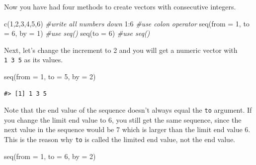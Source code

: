 \documentclass[
]{book}
\newenvironment{Shaded}{\begin{snugshade}}{\end{snugshade}}
\newcommand{\AttributeTok}[1]{\textcolor[rgb]{0.77,0.63,0.00}{#1}}
\newcommand{\CommentTok}[1]{\textcolor[rgb]{0.56,0.35,0.01}{\textit{#1}}}
\newcommand{\DecValTok}[1]{\textcolor[rgb]{0.00,0.00,0.81}{#1}}
\newcommand{\FunctionTok}[1]{\textcolor[rgb]{0.00,0.00,0.00}{#1}}
\newcommand{\NormalTok}[1]{#1}
\newcommand{\SpecialCharTok}[1]{\textcolor[rgb]{0.00,0.00,0.00}{#1}}
\newenvironment{infobox}[1]
  {
  \begin{itemize}
  \renewcommand{\labelitemi}{
    \raisebox{-.7\height}[0pt][0pt]{
      {\setkeys{Gin}{width=3em,keepaspectratio}
        \texttt{[image: pics/\#1]}}
    }
  }
  \setlength{\fboxsep}{1em}
  \begin{blackbox}
  \item
  }
  {
  \end{blackbox}
  \end{itemize}
  }
\newenvironment{blackbox}{
  \definecolor{shadecolor}{rgb}{0, 0, 0}  %
  \color{white}
  \begin{shaded}}
 {\end{shaded}}
\begin{document}
\begin{infobox}{caution}

Now you have had four methods to create vectors with consecutive integers.

\begin{Shaded}
\begin{Highlighting}[]
\FunctionTok{c}\NormalTok{(}\DecValTok{1}\NormalTok{,}\DecValTok{2}\NormalTok{,}\DecValTok{3}\NormalTok{,}\DecValTok{4}\NormalTok{,}\DecValTok{5}\NormalTok{,}\DecValTok{6}\NormalTok{)                }\CommentTok{\#write all numbers down}
\DecValTok{1}\SpecialCharTok{:}\DecValTok{6}                           \CommentTok{\#use colon operator}
\FunctionTok{seq}\NormalTok{(}\AttributeTok{from =} \DecValTok{1}\NormalTok{, }\AttributeTok{to =} \DecValTok{6}\NormalTok{, }\AttributeTok{by =} \DecValTok{1}\NormalTok{) }\CommentTok{\#use seq()}
\FunctionTok{seq}\NormalTok{(}\AttributeTok{to =} \DecValTok{6}\NormalTok{)                   }\CommentTok{\#use seq()}
\end{Highlighting}
\end{Shaded}

\end{infobox}

Next, let's change the increment to 2 and you will get a numeric vector with \texttt{1\ 3\ 5} as its values.

\begin{Shaded}
\begin{Highlighting}[]
\FunctionTok{seq}\NormalTok{(}\AttributeTok{from =} \DecValTok{1}\NormalTok{, }\AttributeTok{to =} \DecValTok{5}\NormalTok{, }\AttributeTok{by =} \DecValTok{2}\NormalTok{)}
\end{Highlighting}
\end{Shaded}

\begin{verbatim}
#> [1] 1 3 5
\end{verbatim}

Note that the end value of the sequence doesn't always equal the \texttt{to} argument. If you change the limit end value to 6, you still get the same sequence, since the next value in the sequence would be 7 which is larger than the limit end value 6. This is the reason why \texttt{to} is called the limited end value, not the end value.

\begin{Shaded}
\begin{Highlighting}[]
\FunctionTok{seq}\NormalTok{(}\AttributeTok{from =} \DecValTok{1}\NormalTok{, }\AttributeTok{to =} \DecValTok{6}\NormalTok{, }\AttributeTok{by =} \DecValTok{2}\NormalTok{) }
\end{Highlighting}
\end{Shaded}
\end{document}
